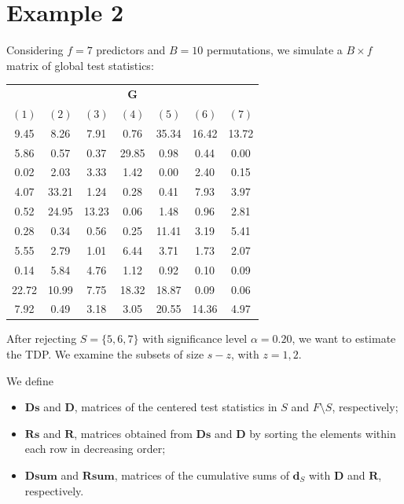 \documentclass[11pt,a4paper,openright,twoside]{article}
\begin{document}
\newpage
\section{Example 2}
Considering $f=7$ predictors and $B=10$ permutations, we simulate a $B\times f$ matrix of global test statistics:

\begin{table}[h!]
\centering
\begin{tabular}{ccccccc}
\multicolumn{7}{c}{$\mathbf{G}$}\\
$(1)$ & $(2)$ & $(3)$ & $(4)$ & $(5)$ & $(6)$ & $(7)$\\
\cline{1-7}
9.45 & 8.26 & 7.91 & 0.76 & 35.34 & 16.42 & 13.72\\
5.86 & 0.57 & 0.37 & 29.85 & 0.98 & 0.44 & 0.00\\
0.02 & 2.03 & 3.33 & 1.42 & 0.00 & 2.40 & 0.15\\
4.07 & 33.21 & 1.24 & 0.28 & 0.41 & 7.93 & 3.97\\
0.52 & 24.95 & 13.23 & 0.06 & 1.48 & 0.96 & 2.81\\
0.28 & 0.34 & 0.56 & 0.25 & 11.41 & 3.19 & 5.41\\
5.55 & 2.79 & 1.01 & 6.44 & 3.71 & 1.73 & 2.07\\
0.14 & 5.84 & 4.76 & 1.12 & 0.92 & 0.10 & 0.09\\
22.72 & 10.99 & 7.75 & 18.32 & 18.87 & 0.09 & 0.06\\
7.92 & 0.49 & 3.18 & 3.05 & 20.55 & 14.36 & 4.97\\
\end{tabular}
\end{table}

After rejecting $S=\{5,6,7\}$ with significance level $\alpha=0.20$, we want to estimate the TDP. We examine the subsets of size $s-z$, with $z=1,2$.

We define
\begin{itemize}
\item $\mathbf{Ds}$ and $\mathbf{D}$, matrices of the centered test statistics in $S$ and $F\setminus S$, respectively;
\item $\mathbf{Rs}$ and $\mathbf{R}$, matrices obtained from $\mathbf{Ds}$ and $\mathbf{D}$ by sorting the elements within each row in decreasing order;
\item $\mathbf{Dsum}$ and $\mathbf{Rsum}$, matrices of the cumulative sums of $\mathbf{d}_S$ with $\mathbf{D}$ and $\mathbf{R}$, respectively.
\end{itemize}
\end{document}
